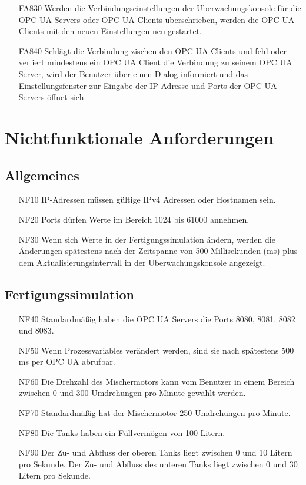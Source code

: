 \documentclass[parskip=full]{scrartcl}
\begin{document}
\begin{enumerate}
  \item[FA830] Werden die Verbindungseinstellungen der \gls{Uberwachungskonsole} für die \glspl{OPC UA Server} oder \glspl{OPC UA Client} überschrieben, werden die \glspl{OPC UA Client} mit den neuen Einstellungen neu gestartet.
  \item[FA840] Schlägt die Verbindung zischen den \glspl{OPC UA Client} und  fehl oder verliert mindestens ein \gls{OPC UA Client} die Verbindung zu seinem \gls{OPC UA Server}, wird
    der Benutzer über einen Dialog informiert und das Einstellungsfenster zur Eingabe der \gls{IP-Adresse} und Ports der \glspl{OPC UA Server} öffnet sich.
\end{enumerate}

\pagebreak
\section{Nichtfunktionale Anforderungen}
\subsection{Allgemeines}
\begin{enumerate}
  \item[NF10] IP-Adressen müssen gültige IPv4 Adressen oder Hostnamen sein.
  \item[NF20] Ports dürfen Werte im Bereich 1024 bis 61000 annehmen.
  \item[NF30] Wenn sich Werte in der \gls{Fertigungssimulation} ändern, werden die Änderungen spätestens nach der Zeitspanne von 500 Millisekunden (ms) plus dem Aktualisierungsintervall in der \gls{Uberwachungskonsole} angezeigt.
\end{enumerate}

\subsection{Fertigungssimulation}
\begin{enumerate}
  \item[NF40] Standardmäßig haben die \glspl{OPC UA Server} die Ports 8080, 8081, 8082 und 8083.
  \item[NF50] Wenn \glspl{Prozessvariable} verändert werden, sind sie nach spätestens 500 ms per \gls{OPC UA} abrufbar.
  \item[NF60] Die Drehzahl des Mischermotors kann vom Benutzer in einem Bereich zwischen 0 und 300 Umdrehungen pro Minute gewählt werden.
  \item[NF70] Standardmäßig hat der Mischermotor 250 Umdrehungen pro Minute.
  \item[NF80] Die Tanks haben ein Füllvermögen von 100 Litern.
  \item[NF90] Der Zu- und Abfluss der oberen Tanks liegt zwischen 0 und 10 Litern pro Sekunde. Der Zu- und Abfluss des unteren Tanks liegt zwischen 0 und 30 Litern pro Sekunde.
\end{enumerate}
\end{document}

